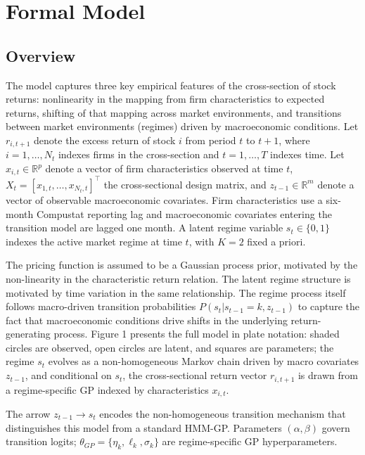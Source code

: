 \documentclass[11pt]{article}
\begin{document}
\section{Formal Model}
\subsection{Overview}
The model captures three key empirical features of the cross-section of stock returns: nonlinearity in the mapping from firm characteristics to expected returns, shifting of that mapping across market environments, and transitions between market environments (regimes) driven by macroeconomic conditions. Let $r_{i,t+1}$ denote the excess return of stock $i$ from period $t$ to $t+1$, where $i=1,\dots,N_t$ indexes firms in the cross-section and $t=1,\dots,T$ indexes time. Let $x_{i,t} \in \mathbb{R}^p$ denote a vector of firm characteristics observed at time $t$, $X_t = [x_{1,t}, \dots, x_{N_t,t}]^\top$ the cross-sectional design matrix, and $z_{t-1}\in\mathbb{R}^m$ denote a vector of observable macroeconomic covariates. Firm characteristics use a six-month Compustat reporting lag and macroeconomic covariates entering the transition model are lagged one month. A latent regime variable $s_t \in \{0,1\}$ indexes the active market regime at time $t$, with $K = 2$ fixed a priori.

The pricing function is assumed to be a Gaussian process prior, motivated by the non-linearity in the characteristic return relation. The latent regime structure is motivated by time variation in the same relationship. The regime process itself follows macro-driven transition probabilities $P(s_t | s_{t-1} = k, z_{t-1})$ to capture the fact that macroeconomic conditions drive shifts in the underlying return-generating process. Figure 1 presents the full model in plate notation: shaded circles are observed, open circles are latent, and squares are parameters; the regime $s_t$ evolves as a non-homogeneous Markov chain driven by macro covariates $z_{t-1}$, and conditional on $s_t$, the cross-sectional return vector $r_{i,t+1}$ is drawn from a regime-specific GP indexed by characteristics $x_{i,t}$.

The arrow $z_{t-1} \to s_t$ encodes the non-homogeneous transition mechanism that distinguishes this model from a standard HMM-GP. Parameters $(\alpha,\beta)$ govern transition logits; $\theta_{GP}=\{\eta_k,\ell_k,\sigma_k\}$ are regime-specific GP hyperparameters.
\end{document}
